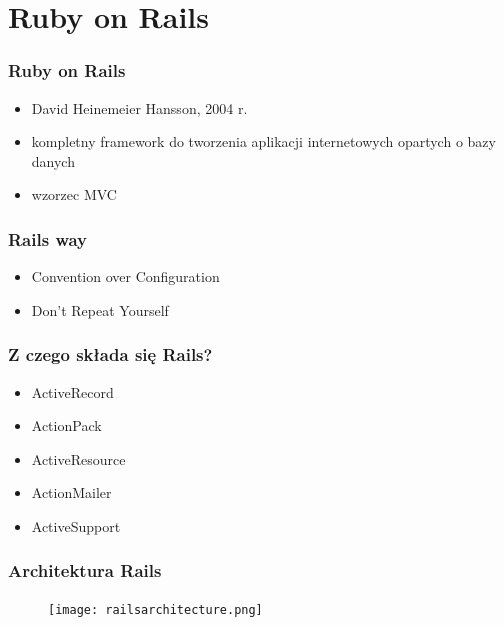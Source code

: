 \documentclass[12t]{beamer}
\begin{document}
\section{Ruby on Rails}
\begin{frame}
  \frametitle{Ruby on Rails}
  \begin{itemize}
  \item David Heinemeier Hansson, 2004 r.
  \item kompletny framework do tworzenia aplikacji internetowych
    opartych o bazy danych
  \item wzorzec MVC
  \end{itemize}
\end{frame}

\begin{frame}
  \frametitle{Rails way}
  \begin{itemize}
  \item Convention over Configuration
  \item Don't Repeat Yourself
  \end{itemize}
\end{frame}

\begin{frame}
  \frametitle{Z czego składa się Rails?}
  \begin{itemize}
  \item ActiveRecord
  \item ActionPack
  \item ActiveResource
  \item ActionMailer
  \item ActiveSupport
  \end{itemize}
\end{frame}

\begin{frame}
  \frametitle{Architektura Rails}
  \begin{figure}
    \centering
    \texttt{[image: railsarchitecture.png]}
  \end{figure}
\end{frame}
\end{document}
